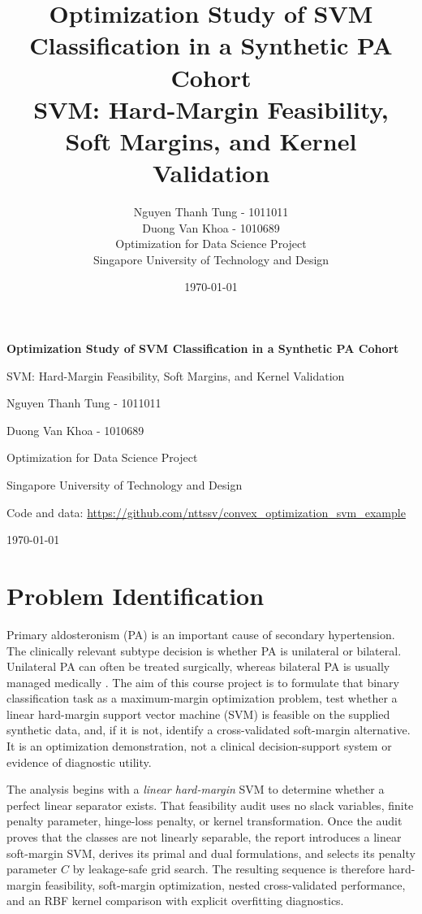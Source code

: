 \documentclass[11pt,a4paper]{article}
\title{\textbf{Optimization Study of SVM Classification in a Synthetic PA Cohort}\\
\large SVM: Hard-Margin Feasibility, Soft Margins, and Kernel Validation}
\author{Nguyen Thanh Tung - 1011011\\
Duong Van Khoa - 1010689\\
Optimization for Data Science Project\\
Singapore University of Technology and Design}
\date{\today}
\numberwithin{equation}{section} %
\begin{document}
\begin{titlepage}
    \centering
    \vspace*{2.2cm}
    {\LARGE\bfseries Optimization Study of SVM Classification in a Synthetic PA Cohort\par}
    \vspace{0.4cm}
    {\large SVM: Hard-Margin Feasibility, Soft Margins, and Kernel Validation\par}
    \vspace{1.8cm}
    {\large Nguyen Thanh Tung - 1011011\par}
    \vspace{0.2cm}
    {\large Duong Van Khoa - 1010689\par}
    \vspace{0.2cm}
    {\large Optimization for Data Science Project\par}
    \vspace{0.2cm}
    {\large Singapore University of Technology and Design\par}
    \vspace{1.2cm}
    {\normalsize Code and data: \url{https://github.com/nttssv/convex_optimization_svm_example}\par}
    \vfill
    {\large \today\par}
\end{titlepage}


\section{Problem Identification}

Primary aldosteronism (PA) is an important cause of secondary hypertension. The clinically relevant subtype decision is whether PA is unilateral or bilateral. Unilateral PA can often be treated surgically, whereas bilateral PA is usually managed medically \cite{rossi2019}. The aim of this course project is to formulate that binary classification task as a maximum-margin optimization problem, test whether a linear hard-margin support vector machine (SVM) is feasible on the supplied synthetic data, and, if it is not, identify a cross-validated soft-margin alternative. It is an optimization demonstration, not a clinical decision-support system or evidence of diagnostic utility.

The analysis begins with a \emph{linear hard-margin} SVM to determine whether a
perfect linear separator exists. That feasibility audit uses no slack
variables, finite penalty parameter, hinge-loss penalty, or kernel
transformation. Once the audit proves that the classes are not linearly
separable, the report introduces a linear soft-margin SVM, derives its primal
and dual formulations, and selects its penalty parameter $C$ by leakage-safe
grid search. The resulting sequence is therefore hard-margin feasibility,
soft-margin optimization, nested cross-validated performance, and an RBF
kernel comparison with explicit overfitting diagnostics.
\end{document}
